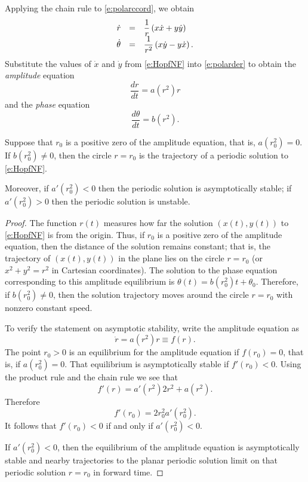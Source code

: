 \documentclass{ximera}
\begin{document}
Applying the chain rule to \eqref{e:polarccord}, we obtain 
\arraystart
\begin{equation}  \label{e:polarder}
\begin{array}{rcl}
\dot{r} & = & \displaystyle\frac{1}{r}\left(x\dot{x} + y\dot{y}\right)\\ 
\dot{\theta} & = & \displaystyle\frac{1}{r^2}\left(x\dot{y}-y\dot{x}\right).
\end{array}
\end{equation}
\arrayfinish
Substitute the values of $\dot{x}$ and $\dot{y}$ from \eqref{e:HopfNF} into 
\eqref{e:polarder} to obtain the 
{\em amplitude\/} equation
\begin{equation} \label{e:amplitude}
\frac{dr}{dt}  =  a(r^2) r
\end{equation}
and the {\em phase\/} equation
\begin{equation} \label{e:phase}
\frac{d\theta}{dt} =  b(r^2).
\end{equation}

\begin{proposition}
Suppose that $r_0$ is a positive zero of the amplitude equation, that is,
$a(r_0^2)=0$.  If $b(r_0^2)\neq 0$, then the circle $r=r_0$ is the
trajectory of a periodic solution to \eqref{e:HopfNF}.  

Moreover, if $a'(r^2_0)<0$ then the periodic solution is asymptotically 
stable; if $a'(r^2_0)>0$ then the periodic solution is unstable.
\end{proposition}

\begin{proof}  The function $r(t)$ measures how far the solution $(x(t),y(t))$ to
\eqref{e:HopfNF} is from the origin.  Thus, if $r_0$ is a positive zero of the 
amplitude equation, then the distance of the solution remains constant; that
is, the trajectory of $(x(t),y(t))$ in the plane lies on the circle $r=r_0$
(or $x^2+y^2=r^2$ in Cartesian coordinates).  The solution to the phase 
equation corresponding to this amplitude equilibrium is 
$\theta(t)=b(r_0^2)t+\theta_0$.  Therefore, if $b(r_0^2)\neq 0$, then the 
solution trajectory moves around the circle $r=r_0$ with nonzero constant 
speed.

To verify the statement on asymptotic stability, write the amplitude 
equation as 
\[
\dot{r} = a(r^2)r \equiv f(r).
\]
The point $r_0>0$ is an equilibrium for the amplitude equation if $f(r_0)=0$, 
that is, if $a(r_0^2)=0$.  That equilibrium is asymptotically stable if 
$f'(r_0)<0$.  Using the product rule and the chain rule we see that 
\[
f'(r) = a'(r^2)2r^2 +a(r^2).
\]
Therefore
\[
f'(r_0) = 2r_0^2a'(r_0^2).
\]
It follows that $f'(r_0)<0$ if and only if $a'(r_0^2)<0$.
  
If $a'(r^2_0)<0$, then the equilibrium of the amplitude equation is 
asymptotically stable and nearby trajectories to the planar periodic solution
limit on that periodic solution $r=r_0$ in forward time.  \end{proof} 
\end{document}
